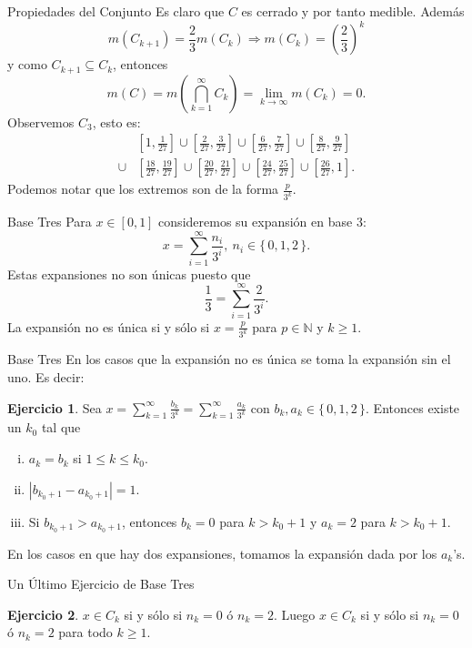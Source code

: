 \documentclass[utf8]{beamer}
\theoremstyle{plain}
\theoremstyle{definition}
\newtheorem{Ej}{Ejercicio}             %
\theoremstyle{remark}
\numberwithin{equation}{section}
\newcommand{\bN}{\mathbb{N}}    %
\newcommand{\bonj}[1]{\left\lbrack#1\right\rbrack}
\newcommand{\set}[1]{\{\,#1\,\}}    %
\renewcommand{\geq}{\geqslant}          %
\renewcommand{\leq}{\leqslant}          %
\newcommand{\To}{\Rightarrow}
\newcommand{\suci}{_{i=1}^\infty} %
\newcommand{\suck}{_{k=1}^\infty} %
\renewcommand{\.}{\Cdot}                %
\begin{document}
\begin{frame}{Propiedades del Conjunto}
Es claro que $C$ es cerrado y por tanto medible. Adem\'as 
$$m(C_{k+1})=\frac23m(C_k)\To m(C_k)=\left(\frac23\right)^k$$
y como $C_{k+1}\subseteq C_k$, entonces 
$$m(C)=m\left(\bigcap\suck C_k\right)=\lim_{k\to\infty} m(C_k)=0.$$
Observemos $C_3$, esto es:
\begin{align*}
&\bonj{1,\frac{1}{27}}\cup\bonj{\frac{2}{27},\frac{3}{27}}\cup\bonj{\frac{6}{27},\frac{7}{27}}\cup\bonj{\frac{8}{27},\frac{9}{27}}\\
\cup&\bonj{\frac{18}{27},\frac{19}{27}}\cup\bonj{\frac{20}{27},\frac{21}{27}}\cup\bonj{\frac{24}{27},\frac{25}{27}}\cup\bonj{\frac{26}{27},1}.
\end{align*}
Podemos notar que los extremos son de la forma $\frac{p}{3^k}$.
\end{frame}

\begin{frame}{Base Tres}
  Para $x\in\bonj{0,1}$ consideremos su expansi\'on en base 3:
  $$x=\sum\suci \frac{n_i}{3^i},\ n_i\in\set{0,1,2}.$$
  Estas expansiones no son \'unicas puesto que 
  $$\frac13=\sum\suci \frac{2}{3^i}.$$
  La expansi\'on no es \'unica si y s\'olo si $x=\frac{p}{3^k}$ para $p\in\bN$ y $k\geq 1$. 
\end{frame}

\begin{frame}{Base Tres}
  En los casos que la expansi\'on no es \'unica se toma la expansi\'on sin el uno. Es decir:
  \begin{Ej}\label{ej:1baseTres}
    Sea $x=\sum\suck\frac{b_k}{3^k}=\sum\suck\frac{a_k}{3^k}$ con $b_k,a_k\in\set{0,1,2}$. Entonces existe un $k_0$ tal que 
    \begin{enumerate}[(i)]
      \item $a_k=b_k$ si $1\leq k\leq k_0$.
      \item $|b_{k_0+1}-a_{k_0+1}|=1$.
      \item Si $b_{k_0+1}>a_{k_0+1}$, entonces $b_k=0$ para $k>k_0+1$ y $a_k=2$ para $k>k_0+1$.
    \end{enumerate}
  \end{Ej}
  En los casos en que hay dos expansiones, tomamos la expansi\'on dada por los $a_k$'s.
\end{frame}

\begin{frame}{Un \'Ultimo Ejercicio de Base Tres}
  \begin{Ej}\label{ej:2baseTres}
    $x\in C_k$ si y s\'olo si $n_k=0$ \'o $n_k=2$. Luego $x\in C_k$ si y s\'olo si $n_k=0$ \'o $n_k=2$ para todo $k\geq 1$.
  \end{Ej}
\end{frame}
\end{document}
